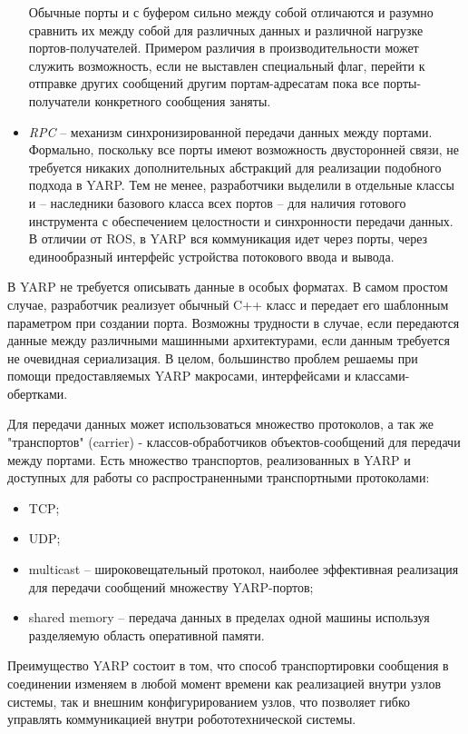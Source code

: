 \begin{itemize}
	Обычные порты  и с буфером  сильно между собой отличаются и разумно сравнить их между собой для различных данных и различной нагрузке портов-получателей. Примером различия в производительности может служить возможность, если не выставлен специальный флаг, перейти к отправке других сообщений другим портам-адресатам пока все порты-получатели конкретного сообщения заняты.
	
	\item \textit{RPC} -- механизм синхронизированной передачи данных между портами. Формально, поскольку все порты имеют возможность двусторонней связи, не требуется никаких дополнительных абстракций для реализации подобного подхода в YARP. Тем не менее, разработчики выделили в отдельные классы  и  -- наследники базового класса всех портов  -- для наличия готового инструмента с обеспечением целостности и синхронности передачи данных. В отличии от ROS, в YARP вся коммуникация идет через порты, через единообразный интерфейс устройства потокового ввода и вывода. 
\end{itemize}

В YARP не требуется описывать данные в особых форматах. В самом простом случае, разработчик реализует обычный C++ класс и передает его шаблонным параметром при создании порта. Возможны трудности в случае, если передаются данные между различными машинными архитектурами, если данным требуется не очевидная сериализация. В целом, большинство проблем решаемы при помощи предоставляемых YARP макросами, интерфейсами и классами-обертками.

Для передачи данных может использоваться множество протоколов, а так же "транспортов" (carrier) - классов-обработчиков объектов-сообщений для передачи между портами. Есть множество транспортов, реализованных в YARP и доступных для работы со распространенными транспортными протоколами:
\begin{itemize}[noitemsep]
	\item TCP;
	\item UDP;
	\item multicast -- широковещательный протокол, наиболее эффективная реализация для передачи сообщений множеству YARP-портов;
	\item shared memory -- передача данных в пределах одной машины используя разделяемую область оперативной памяти.
\end{itemize}
Преимущество YARP состоит в том, что способ транспортировки сообщения в соединении изменяем в любой момент времени как реализацией внутри узлов системы, так и внешним конфигурированием узлов, что позволяет гибко управлять коммуникацией внутри робототехнической системы.


